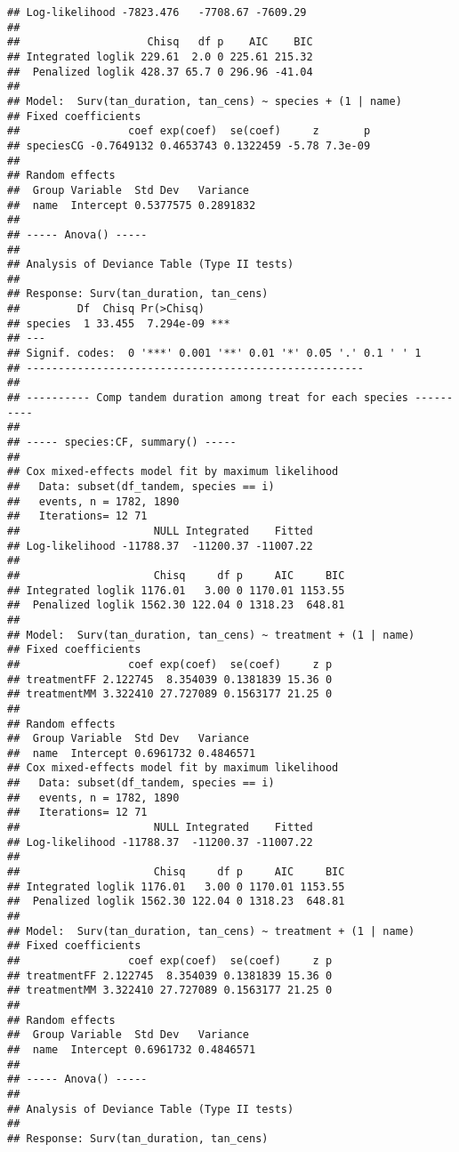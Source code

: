 \documentclass[
]{article}
\begin{document}
\begin{verbatim}
## Log-likelihood -7823.476   -7708.67 -7609.29
## 
##                    Chisq   df p    AIC    BIC
## Integrated loglik 229.61  2.0 0 225.61 215.32
##  Penalized loglik 428.37 65.7 0 296.96 -41.04
## 
## Model:  Surv(tan_duration, tan_cens) ~ species + (1 | name) 
## Fixed coefficients
##                 coef exp(coef)  se(coef)     z       p
## speciesCG -0.7649132 0.4653743 0.1322459 -5.78 7.3e-09
## 
## Random effects
##  Group Variable  Std Dev   Variance 
##  name  Intercept 0.5377575 0.2891832
## 
## ----- Anova() -----
## 
## Analysis of Deviance Table (Type II tests)
## 
## Response: Surv(tan_duration, tan_cens)
##         Df  Chisq Pr(>Chisq)    
## species  1 33.455  7.294e-09 ***
## ---
## Signif. codes:  0 '***' 0.001 '**' 0.01 '*' 0.05 '.' 0.1 ' ' 1
## -----------------------------------------------------
## 
## ---------- Comp tandem duration among treat for each species ----------
## 
## ----- species:CF, summary() -----
## 
## Cox mixed-effects model fit by maximum likelihood
##   Data: subset(df_tandem, species == i)
##   events, n = 1782, 1890
##   Iterations= 12 71 
##                     NULL Integrated    Fitted
## Log-likelihood -11788.37  -11200.37 -11007.22
## 
##                     Chisq     df p     AIC     BIC
## Integrated loglik 1176.01   3.00 0 1170.01 1153.55
##  Penalized loglik 1562.30 122.04 0 1318.23  648.81
## 
## Model:  Surv(tan_duration, tan_cens) ~ treatment + (1 | name) 
## Fixed coefficients
##                 coef exp(coef)  se(coef)     z p
## treatmentFF 2.122745  8.354039 0.1381839 15.36 0
## treatmentMM 3.322410 27.727089 0.1563177 21.25 0
## 
## Random effects
##  Group Variable  Std Dev   Variance 
##  name  Intercept 0.6961732 0.4846571
## Cox mixed-effects model fit by maximum likelihood
##   Data: subset(df_tandem, species == i)
##   events, n = 1782, 1890
##   Iterations= 12 71 
##                     NULL Integrated    Fitted
## Log-likelihood -11788.37  -11200.37 -11007.22
## 
##                     Chisq     df p     AIC     BIC
## Integrated loglik 1176.01   3.00 0 1170.01 1153.55
##  Penalized loglik 1562.30 122.04 0 1318.23  648.81
## 
## Model:  Surv(tan_duration, tan_cens) ~ treatment + (1 | name) 
## Fixed coefficients
##                 coef exp(coef)  se(coef)     z p
## treatmentFF 2.122745  8.354039 0.1381839 15.36 0
## treatmentMM 3.322410 27.727089 0.1563177 21.25 0
## 
## Random effects
##  Group Variable  Std Dev   Variance 
##  name  Intercept 0.6961732 0.4846571
## 
## ----- Anova() -----
## 
## Analysis of Deviance Table (Type II tests)
## 
## Response: Surv(tan_duration, tan_cens)

\end{verbatim}
\end{document}
